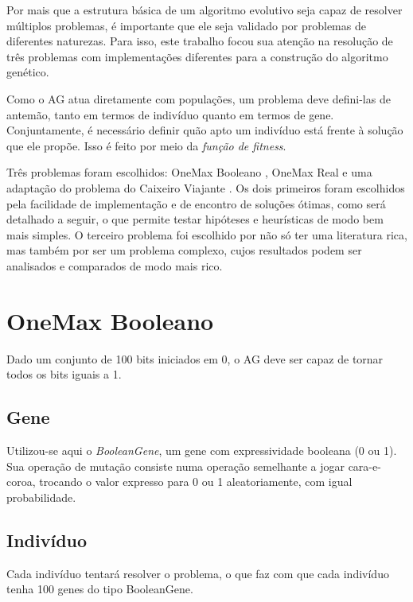 \label{2_problemas}

Por mais que a estrutura básica de um algoritmo evolutivo seja capaz de resolver múltiplos problemas, é importante que ele seja validado por problemas de diferentes naturezas. Para isso, este trabalho focou sua atenção na resolução de três problemas com implementações diferentes para a construção do algoritmo genético.

Como o AG atua diretamente com populações, um problema deve defini-las de antemão, tanto em termos de indivíduo quanto em termos de gene. Conjuntamente, é necessário definir quão apto um indivíduo está frente à solução que ele propõe. Isso é feito por meio da \emph{função de fitness}.

Três problemas foram escolhidos: OneMax Booleano \cite{giguere1998population}, OneMax Real e uma adaptação do problema do Caixeiro Viajante \cite{applegate2011traveling}. Os dois primeiros foram escolhidos pela facilidade de implementação e de encontro de soluções ótimas, como será detalhado a seguir, o que permite testar hipóteses e heurísticas de modo bem mais simples. O terceiro problema foi escolhido por não só ter uma literatura rica, mas também por ser um problema complexo, cujos resultados podem ser analisados e comparados de modo mais rico.

\section{OneMax Booleano}

Dado um conjunto de 100 bits iniciados em 0, o AG deve ser capaz de tornar todos os bits iguais a 1.

\subsection*{Gene}

Utilizou-se aqui o \emph{BooleanGene}, um gene com expressividade booleana (0 ou 1). Sua operação de mutação consiste numa operação semelhante a jogar cara-e-coroa, trocando o valor expresso para 0 ou 1 aleatoriamente, com igual probabilidade.

\subsection*{Indivíduo}

Cada indivíduo tentará resolver o problema, o que faz com que cada indivíduo tenha 100 genes do tipo BooleanGene.

